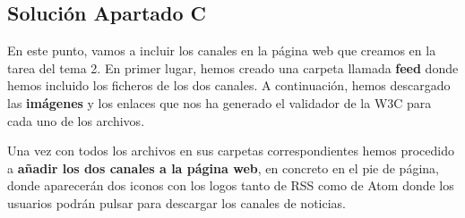 \subsection{Solución Apartado C}
En este punto, vamos a incluir los canales en la página web que creamos en la tarea del tema 2. En primer lugar, hemos creado una carpeta llamada \textbf{feed} donde hemos incluido los ficheros de los dos canales. A continuación, hemos descargado las \textbf{imágenes} y los enlaces que nos ha generado el validador de la W3C para cada uno de los archivos.

Una vez con todos los archivos en sus carpetas correspondientes hemos procedido a \textbf{añadir los dos canales a la página web}, en concreto en el pie de página, donde aparecerán dos iconos con los logos tanto de RSS como de Atom donde los usuarios podrán pulsar para descargar los canales de noticias.

\newpage




